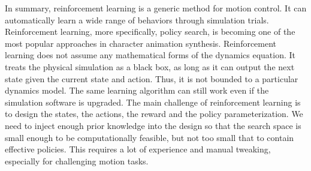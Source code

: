 In summary, reinforcement learning is a generic method for motion control. It can automatically learn a wide range of behaviors through simulation trials. Reinforcement learning, more specifically, policy search, is becoming one of the most popular approaches in character animation synthesis. Reinforcement learning does not assume any mathematical forms of the dynamics equation. It treats the physical simulation as a black box, as long as it can output the next state given the current state and action. Thus, it is not bounded to a particular dynamics model. The same learning algorithm can still work even if the simulation software is upgraded. The main challenge of reinforcement learning is to design the states, the actions, the reward and the policy parameterization. We need to inject enough prior knowledge into the design so that the search space is small enough to be computationally feasible, but not too small that to contain effective policies. This requires a lot of experience and manual tweaking, especially for challenging motion tasks. 
